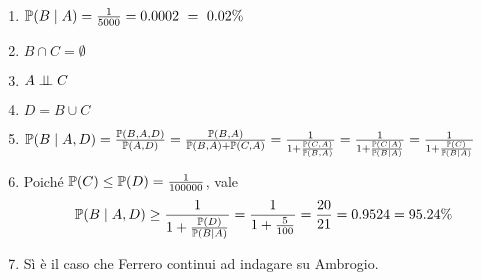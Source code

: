 \Soluzione

\Soluzione

\Soluzione

\Soluzione

\begin{enumerate}
	\item $\mathbb{P}(B\mid A) =\frac{1}{5000} =0.0002\ =\ 0.02\%$
	\item $B\cap C=\emptyset $
	\item $A\perp \!\!\! \perp C$
	\item $D=B\cup C$
	\item $\mathbb{P}(B\mid A,D) =\frac{\mathbb{P}(B,A,D)}{\mathbb{P}(A,D)} =\frac{\mathbb{P}(B,A)}{\mathbb{P}(B,A) +\mathbb{P}(C,A)} =\frac{1}{1+\frac{\mathbb{P}(C,A)}{\mathbb{P}(B,A)}} =\frac{1}{1+\frac{\mathbb{P}(C\mid A)}{\mathbb{P}(B\mid A)}} =\frac{1}{1+\frac{\mathbb{P}(C)}{\mathbb{P}(B\mid A)}}$
	\item Poiché $\mathbb{P}(C) \leq \mathbb{P}(D) =\frac{1}{100000}$, vale
	\begin{equation*}
	\mathbb{P}(B\mid A,D) \geq \frac{1}{1+\frac{\mathbb{P}(D)}{\mathbb{P}(B\mid A)}} =\frac{1}{1+\frac{5}{100}} =\frac{20}{21} =0.9524=95.24\%
	\end{equation*}
	\item Sì è il caso che Ferrero continui ad indagare su Ambrogio.
\end{enumerate}

\Soluzione

